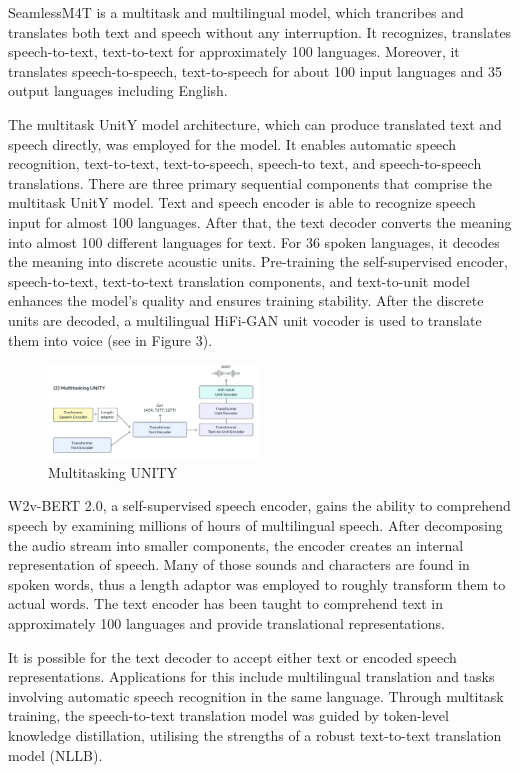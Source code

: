 \documentclass[conference]{IEEEtran}
\begin{document}
\quad \quad SeamlessM4T is a multitask and multilingual model, which trancribes and translates both text and speech without any interruption. It recognizes, translates speech-to-text, text-to-text for approximately 100 languages. Moreover, it translates speech-to-speech, text-to-speech for about 100 input languages and 35 output languages including English.

The multitask UnitY model architecture, which can produce translated text and speech directly, was employed for the model. It enables automatic speech recognition, text-to-text, text-to-speech, speech-to text, and speech-to-speech translations. There are three primary sequential components that comprise the multitask UnitY model. Text and speech encoder is able to recognize speech input for almost 100 languages. After that, the text decoder converts the meaning into almost 100 different languages for text. For 36 spoken languages, it decodes the meaning into discrete acoustic units. Pre-training the self-supervised encoder, speech-to-text, text-to-text translation components, and text-to-unit model enhances the model's quality and ensures training stability. After the discrete units are decoded, a multilingual HiFi-GAN unit vocoder is used to translate them into voice (see in Figure 3).

\begin{figure}[ht]
\centering
\includegraphics[width=0.5\textwidth]{16.png}
\caption{Multitasking UNITY}
\label{fig:whisper_asr_architecture}
\end{figure}

W2v-BERT 2.0, a self-supervised speech encoder, gains the ability to comprehend speech by examining millions of hours of multilingual speech. After decomposing the audio stream into smaller components, the encoder creates an internal representation of speech. Many of those sounds and characters are found in spoken words, thus a length adaptor was employed to roughly transform them to actual words. The text encoder has been taught to comprehend text in approximately 100 languages and provide translational representations.

It is possible for the text decoder to accept either text or encoded speech representations. Applications for this include multilingual translation and tasks involving automatic speech recognition in the same language. Through multitask training, the speech-to-text translation model was guided by token-level knowledge distillation, utilising the strengths of a robust text-to-text translation model (NLLB).
\end{document}
